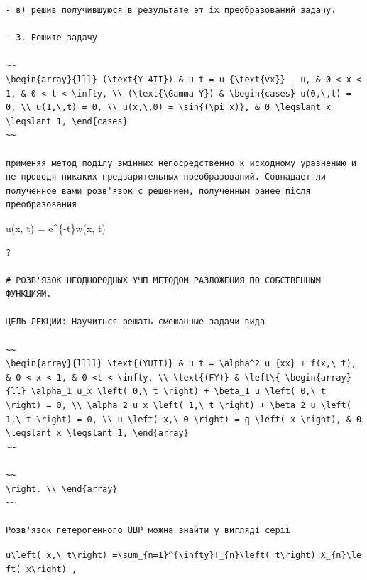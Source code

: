 \documentclass[
  ukrainian,
]{article}
\begin{document}
\begin{verbatim}
- в) решив получившуюся в результате эт іх преобразований задачу.

- 3. Решите задачу

~~
\begin{array}{lll} (\text{Y 4II}) & u_t = u_{\text{vx}} - u, & 0 < x < 1, & 0 < t < \infty, \\ (\text{\Gamma Y}) & \begin{cases} u(0,\,t) = 0, \\ u(1,\,t) = 0, \\ u(x,\,0) = \sin{(\pi x)}, & 0 \leqslant x \leqslant 1, \end{cases}
~~

применяя метод поділу змінних непосредственно к исходному уравнению и не проводя никаких предварительных преобразований. Совпадает ли полученное вами розв'язок с решением, полученным ранее після преобразования
\end{verbatim}

u(x, t) = e\^{}\{-t\}w(x, t)

\begin{verbatim}
?

# РОЗВ'ЯЗОК НЕОДНОРОДНЫХ УЧП МЕТОДОМ РАЗЛОЖЕНИЯ ПО СОБСТВЕННЫМ ФУНКЦИЯМ.

ЦЕЛЬ ЛЕКЦИИ: Научиться решать смешанные задачи вида

~~
\begin{array}{llll} \text{(YUII)} & u_t = \alpha^2 u_{xx} + f(x,\ t), & 0 < x < 1, & 0 <t < \infty, \\ \text{(FY)} & \left\{ \begin{array}{ll} \alpha_1 u_x \left( 0,\ t \right) + \beta_1 u \left( 0,\ t \right) = 0, \\ \alpha_2 u_x \left( 1,\ t \right) + \beta_2 u \left( 1,\ t \right) = 0, \\ u \left( x,\ 0 \right) = q \left( x \right), & 0 \leqslant x \leqslant 1, \end{array}
~~

~~
\right. \\ \end{array}
~~

Розв'язок гетерогенного UBP можна знайти у вигляді серії
\end{verbatim}

\texttt{u\textbackslash{}left(\ x,\textbackslash{}\ t\textbackslash{}right)\ =\textbackslash{}sum\_\{n=1\}\^{}\{\textbackslash{}infty\}T\_\{n\}\textbackslash{}left(\ t\textbackslash{}right)\ X\_\{n\}\textbackslash{}left(\ x\textbackslash{}right)\ ,}
\end{document}
